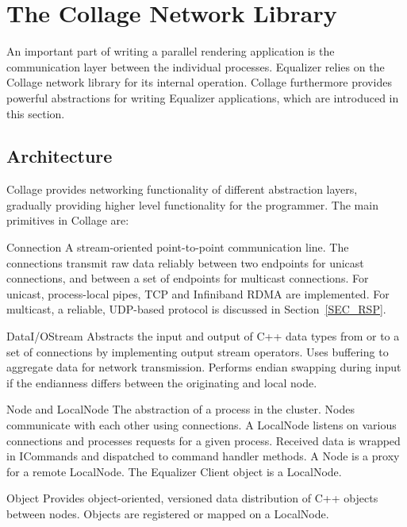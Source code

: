 \documentclass[10pt,journal,compsoc]{IEEEtran}
\newcommand{\sref}[1]{Section~\ref{#1}}
\begin{document}
\section{The Collage Network Library}

An important part of writing a parallel rendering application is the
communication layer between the individual processes. Equalizer relies on the
Collage network library for its internal operation. Collage furthermore provides
powerful abstractions for writing Equalizer applications, which are introduced
in this section.

\subsection{Architecture}

Collage provides networking functionality of different abstraction layers,
gradually providing higher level functionality for the programmer. The main
primitives in Collage are:

\begin{compactdesc}
\item[Connection] A stream-oriented point-to-point communication
  line. The connections
  transmit raw data reliably between two endpoints for unicast connections, and
  between a set of endpoints for multicast connections. For unicast,
  process-local pipes, TCP and Infiniband RDMA are implemented. For multicast,
  a reliable, UDP-based protocol is discussed in \sref{SEC_RSP}.
\item[DataI/OStream] Abstracts the input and output of C++ data types from or to
  a set of connections by implementing output stream operators. Uses buffering
  to aggregate data for network transmission. Performs endian swapping during
  input if the endianness differs between the originating and local node.
\item[Node and LocalNode] The abstraction of a process in the cluster. Nodes
  communicate with each other using connections. A LocalNode listens on various
  connections and processes requests for a given process. Received data is
  wrapped in ICommands and dispatched to command handler methods. A Node is a
  proxy for a remote LocalNode. The Equalizer Client object is a LocalNode.
\item[Object] Provides object-oriented, versioned data distribution of C++
  objects between nodes. Objects are registered or mapped on a Local\-Node.
\end{compactdesc}
\end{document}

